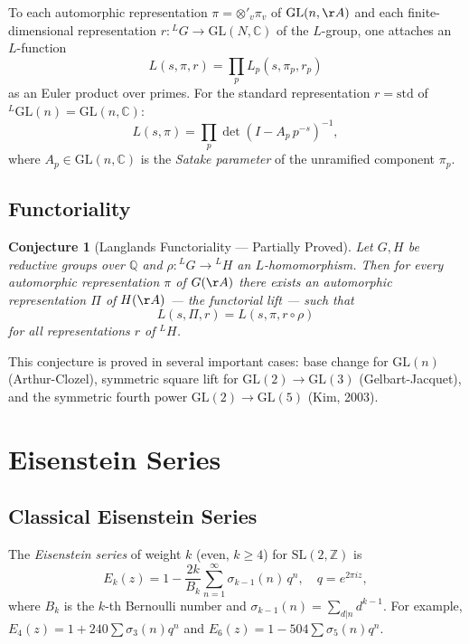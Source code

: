 \documentclass[12pt,a4paper]{amsart}
\newtheorem{conjecture}[theorem]{Conjecture}
\theoremstyle{definition}
\newcommand{\ZZ}{\mathbb{Z}}
\newcommand{\QQ}{\mathbb{Q}}
\newcommand{\CC}{\mathbb{C}}
\newcommand{\GL}{\mathrm{GL}}
\newcommand{\SL}{\mathrm{SL}}
\begin{document}
To each automorphic representation $\pi = \otimes'_v \pi_v$ of $\GL(n,\AA)$ and
each finite-dimensional representation $r: {}^L G \to \GL(N,\CC)$ of the $L$-group,
one attaches an $L$-function
\[
L(s, \pi, r) = \prod_p L_p(s, \pi_p, r_p)
\]
as an Euler product over primes. For the standard representation $r = \mathrm{std}$
of ${}^L\GL(n) = \GL(n,\CC)$:
\[
L(s, \pi) = \prod_p \det\!\left(I - A_p\, p^{-s}\right)^{-1},
\]
where $A_p \in \GL(n,\CC)$ is the \emph{Satake parameter} of the unramified component
$\pi_p$.

\subsection{Functoriality}

\begin{conjecture}[Langlands Functoriality — Partially Proved]
\label{conj:functoriality}
Let $G, H$ be reductive groups over $\QQ$ and $\rho: {}^L G \to {}^L H$ an
$L$-homomorphism. Then for every automorphic representation $\pi$ of $G(\AA)$
there exists an automorphic representation $\Pi$ of $H(\AA)$ — the \emph{functorial
lift} — such that
\[
L(s, \Pi, r) = L(s, \pi, r \circ \rho)
\]
for all representations $r$ of ${}^L H$.
\end{conjecture}

This conjecture is proved in several important cases: base change for $\GL(n)$
(Arthur-Clozel), symmetric square lift for $\GL(2) \to \GL(3)$ (Gelbart-Jacquet),
and the symmetric fourth power $\GL(2) \to \GL(5)$ (Kim, 2003).

\section{Eisenstein Series}
\label{sec:eisenstein}

\subsection{Classical Eisenstein Series}

The \emph{Eisenstein series} of weight $k$ (even, $k \geq 4$) for $\SL(2,\ZZ)$ is
\[
E_k(z) = 1 - \frac{2k}{B_k} \sum_{n=1}^\infty \sigma_{k-1}(n)\, q^n,
\quad q = e^{2\pi iz},
\]
where $B_k$ is the $k$-th Bernoulli number and $\sigma_{k-1}(n) = \sum_{d|n} d^{k-1}$.
For example, $E_4(z) = 1 + 240 \sum \sigma_3(n) q^n$ and $E_6(z) = 1 - 504 \sum \sigma_5(n) q^n$.
\end{document}
